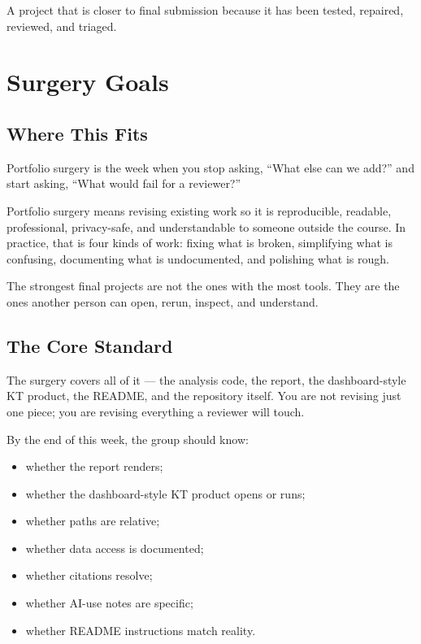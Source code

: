 \documentclass[
  letterpaper,
  DIV=11,
  numbers=noendperiod,
  oneside]{scrreprt}
\providecommand{\tightlist}{%
  \setlength{\itemsep}{0pt}\setlength{\parskip}{0pt}}
\begin{document}

A project that is closer to final submission because it has been tested,
repaired, reviewed, and triaged.

\chapter*{Surgery Goals}\label{surgery-goals}


\section*{Where This Fits}\label{where-this-fits-23}


Portfolio surgery is the week when you stop asking, ``What else can we
add?'' and start asking, ``What would fail for a reviewer?''

Portfolio surgery means revising existing work so it is reproducible,
readable, professional, privacy-safe, and understandable to someone
outside the course. In practice, that is four kinds of work: fixing what
is broken, simplifying what is confusing, documenting what is
undocumented, and polishing what is rough.

The strongest final projects are not the ones with the most tools. They
are the ones another person can open, rerun, inspect, and understand.

\section*{The Core Standard}\label{the-core-standard}


The surgery covers all of it --- the analysis code, the report, the
dashboard-style KT product, the README, and the repository itself. You
are not revising just one piece; you are revising everything a reviewer
will touch.

By the end of this week, the group should know:

\begin{itemize}
\tightlist
\item
  whether the report renders;
\item
  whether the dashboard-style KT product opens or runs;
\item
  whether paths are relative;
\item
  whether data access is documented;
\item
  whether citations resolve;
\item
  whether AI-use notes are specific;
\item
  whether README instructions match reality.
\end{itemize}
\end{document}
